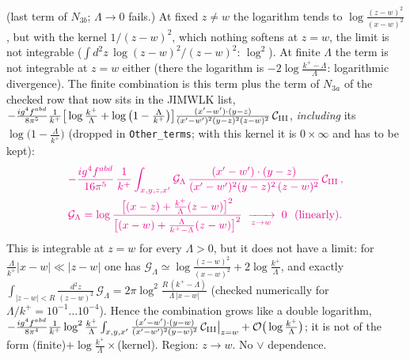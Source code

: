 \documentclass[9pt]{article}
\numberwithin{equation}{section}
\begin{document}
{\color{magenta} (last term of $N_{3b}$; $\Lambda\to0$ fails.) At fixed $z\neq w$ the logarithm tends to $\log\frac{(z-w)^{2}}{(x-w)^{2}}$, but with the kernel $1/(z-w)^{2}$, which nothing softens at $z=w$, the limit is not integrable ($\int d^{2}z\,\log(z-w)^{2}/(z-w)^{2}$: $\log^{2}$). At finite $\Lambda$ the term is not integrable at $z=w$ either (there the logarithm is $-2\log\frac{k^{+}-\Lambda}{\Lambda}$: logarithmic divergence). The finite combination is this term plus the term of $N_{3a}$ of the checked row that now sits in the JIMWLK list, $-\frac{ig^{4}f^{abd}}{8\pi^{5}}\frac{1}{k^{+}}\big[\log\frac{k^{+}}{\Lambda}+\log\big(1-\frac{\Lambda}{k^{+}}\big)\big]\frac{(x'-w')\cdot(y-z)}{(x'-w')^{2}(y-z)^{2}(z-w)^{2}}\,\mathcal{C}_{\rm III}$, \emph{including} its $\log\big(1-\frac{\Lambda}{k^{+}}\big)$ (dropped in \texttt{Other\_terms}; with this kernel it is $0\times\infty$ and has to be kept):
\begin{align}
&{\color{magenta}-\frac{ig^{4}f^{abd}}{16\pi^{5}}\,\frac{1}{k^{+}}\int_{x,y,z,x'}\mathcal{G}_{\Lambda}\,\frac{(x'-w')\cdot(y-z)}{(x'-w')^{2}(y-z)^{2}\,(z-w)^{2}}\,\mathcal{C}_{\rm III}\,,}\notag\\
&{\color{magenta}\mathcal{G}_{\Lambda}=\log\frac{\big[(x-z)+\frac{k^{+}}{\Lambda}(z-w)\big]^{2}}{\big[(x-w)+\frac{\Lambda}{k^{+}-\Lambda}(z-w)\big]^{2}}\;\xrightarrow[z\to w]{}\;0\ \ (\text{linearly}).}\notag
\end{align}
This is integrable at $z=w$ for every $\Lambda>0$, but it does not have a limit: for $\frac{\Lambda}{k^{+}}|x-w|\ll|z-w|$ one has $\mathcal{G}_{\Lambda}\simeq\log\frac{(z-w)^{2}}{(x-w)^{2}}+2\log\frac{k^{+}}{\Lambda}$, and exactly $\int_{|z-w|<R}\frac{d^{2}z}{(z-w)^{2}}\,\mathcal{G}_{\Lambda}=2\pi\log^{2}\frac{R\,(k^{+}-\Lambda)}{\Lambda\,|x-w|}$ (checked numerically for $\Lambda/k^{+}=10^{-1}\dots10^{-4}$). Hence the combination grows like a double logarithm,
$-\frac{ig^{4}f^{abd}}{8\pi^{4}}\frac{1}{k^{+}}\log^{2}\frac{k^{+}}{\Lambda}\int_{x,y,x'}\frac{(x'-w')\cdot(y-w)}{(x'-w')^{2}(y-w)^{2}}\,\mathcal{C}_{\rm III}\big|_{z=w}+{\cal O}\big(\log\frac{k^{+}}{\Lambda}\big)$; it is not of the form (finite)$+\log\frac{k^{+}}{\Lambda}\times$(kernel). Region: $z\to w$. No $\vee$ dependence.}
\end{document}
